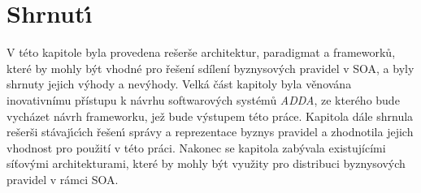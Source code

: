 \section{Shrnut\'{\i}}

V této kapitole byla provedena rešerše architektur, paradigmat a frameworků, které by mohly být vhodné
pro řešení sdílení byznysových pravidel v \gls{SOA}, a byly shrnuty jejich v\'yhody a nev\'yhody.
Velká část kapitoly byla věnována inovativnímu přístupu k návrhu softwarov\'ych systémů \textit{ADDA},
ze kterého bude vycházet návrh frameworku, jež bude výstupem této práce.
Kapitola dále shrnula rešerši stávaj\'{\i}c\'{\i}ch řešen\'{\i} správy a reprezentace byznys pravidel
a zhodnotila jejich vhodnost pro použití v této práci. Nakonec se kapitola zabývala existujícími
síťovými architekturami, které by mohly být využity pro distribuci byznysových pravidel v rámci \gls{SOA}.
